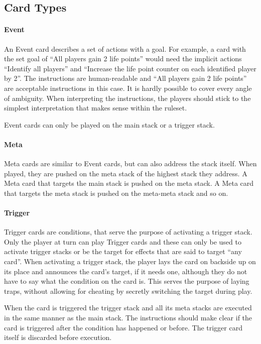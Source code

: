 \documentclass[a4paper,10pt]{article}
\begin{document}
\subsection{Card Types}

\paragraph{Event}

An Event card describes a set of actions with a goal. For example, a card with the set
goal of ``All players gain 2 life points'' would need the implicit actions ``Identify all
players'' and ``Increase the life point counter on each identified player by 2''. The
instructions are human-readable and ``All players gain 2 life points'' are acceptable
instructions in this case. It is hardly possible to cover every angle of ambiguity. When
interpreting the instructions, the players should stick to the simplest interpretation
that makes sense within the ruleset.

Event cards can only be played on the main stack or a trigger stack.

\paragraph{Meta}

Meta cards are similar to Event cards, but can also address the stack itself. When
played, they are pushed on the meta stack of the highest stack they address. A Meta card
that targets the main stack is pushed on the meta stack. A Meta card that targets the
meta stack is pushed on the meta-meta stack and so on.

\paragraph{Trigger}

Trigger cards are conditions, that serve the purpose of activating a trigger stack. Only
the player at turn can play Trigger cards and these can only be used to activate trigger
stacks or be the target for effects that are said to target ``any card''. When activating
a trigger stack, the player lays the card on backside up on its place and announces the
card's target, if it needs one, although they do not have to say what the
condition on the card is. This serves the purpose of laying traps, without allowing for
cheating by secretly switching the target during play.

When the card is triggered the trigger stack and all its meta stacks
are executed in the same manner as the main stack. The instructions should make clear if
the card is triggered after the condition has happened or before. The trigger card itself
is discarded before execution.
\end{document}
